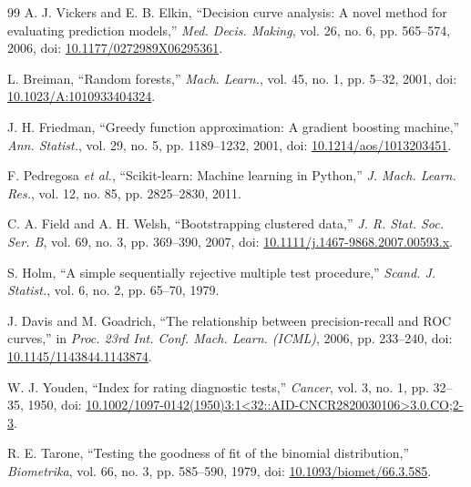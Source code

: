 \documentclass[journal]{IEEEtran}
\begin{document}
\begin{thebibliography}{99}
 A. J. Vickers and E. B. Elkin, ``Decision curve analysis: A novel method for evaluating prediction models,'' \emph{Med. Decis. Making}, vol. 26, no. 6, pp. 565--574, 2006, doi: \url{10.1177/0272989X06295361}.

 L. Breiman, ``Random forests,'' \emph{Mach. Learn.}, vol. 45, no. 1, pp. 5--32, 2001, doi: \url{10.1023/A:1010933404324}.

 J. H. Friedman, ``Greedy function approximation: A gradient boosting machine,'' \emph{Ann. Statist.}, vol. 29, no. 5, pp. 1189--1232, 2001, doi: \url{10.1214/aos/1013203451}.

 F. Pedregosa \emph{et al.}, ``Scikit-learn: Machine learning in Python,'' \emph{J. Mach. Learn. Res.}, vol. 12, no. 85, pp. 2825--2830, 2011.

 C. A. Field and A. H. Welsh, ``Bootstrapping clustered data,'' \emph{J. R. Stat. Soc. Ser. B}, vol. 69, no. 3, pp. 369--390, 2007, doi: \url{10.1111/j.1467-9868.2007.00593.x}.

 S. Holm, ``A simple sequentially rejective multiple test procedure,'' \emph{Scand. J. Statist.}, vol. 6, no. 2, pp. 65--70, 1979.

 J. Davis and M. Goadrich, ``The relationship between precision-recall and ROC curves,'' in \emph{Proc. 23rd Int. Conf. Mach. Learn. (ICML)}, 2006, pp. 233--240, doi: \url{10.1145/1143844.1143874}.

 W. J. Youden, ``Index for rating diagnostic tests,'' \emph{Cancer}, vol. 3, no. 1, pp. 32--35, 1950, doi: \url{10.1002/1097-0142(1950)3:1<32::AID-CNCR2820030106>3.0.CO;2-3}.

 R. E. Tarone, ``Testing the goodness of fit of the binomial distribution,'' \emph{Biometrika}, vol. 66, no. 3, pp. 585--590, 1979, doi: \url{10.1093/biomet/66.3.585}.

\end{thebibliography}
\end{document}
